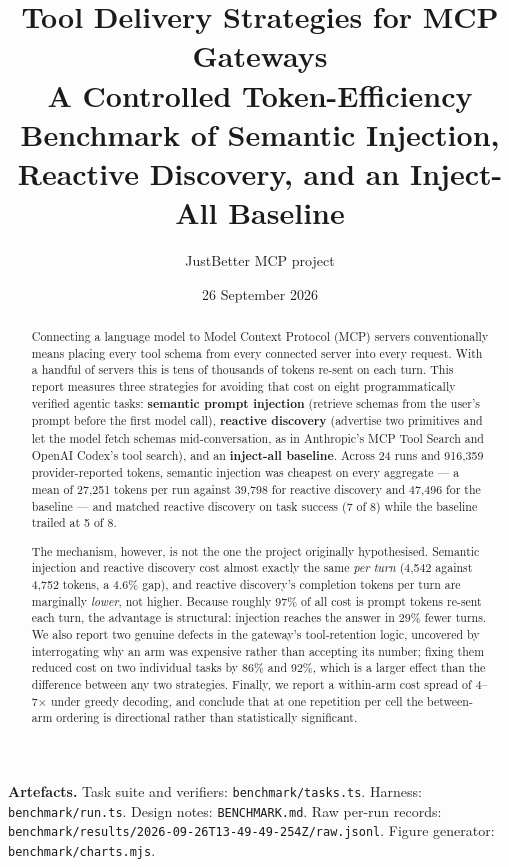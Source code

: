 \documentclass[11pt,a4paper]{article}
\title{\textbf{Tool Delivery Strategies for MCP Gateways}\\[0.35em]
\large A Controlled Token-Efficiency Benchmark of Semantic Injection,\\
Reactive Discovery, and an Inject-All Baseline}
\author{JustBetter MCP project}
\date{26 September 2026}
\begin{document}
\maketitle

\begin{abstract}
\noindent
Connecting a language model to Model Context Protocol (MCP) servers conventionally means placing
every tool schema from every connected server into every request. With a handful of servers this is
tens of thousands of tokens re-sent on each turn. This report measures three strategies for avoiding
that cost on eight programmatically verified agentic tasks: \textbf{semantic prompt injection}
(retrieve schemas from the user's prompt before the first model call), \textbf{reactive discovery}
(advertise two primitives and let the model fetch schemas mid-conversation, as in Anthropic's MCP
Tool Search and OpenAI Codex's tool search), and an \textbf{inject-all baseline}. Across 24 runs and
916{,}359 provider-reported tokens, semantic injection was cheapest on every aggregate --- a mean of
27{,}251 tokens per run against 39{,}798 for reactive discovery and 47{,}496 for the baseline --- and
matched reactive discovery on task success (7 of 8) while the baseline trailed at 5 of 8.

The mechanism, however, is not the one the project originally hypothesised. Semantic injection and
reactive discovery cost almost exactly the same \emph{per turn} (4{,}542 against 4{,}752 tokens, a
4.6\% gap), and reactive discovery's completion tokens per turn are marginally \emph{lower}, not
higher. Because roughly 97\% of all cost is prompt tokens re-sent each turn, the advantage is
structural: injection reaches the answer in 29\% fewer turns. We also report two genuine defects in
the gateway's tool-retention logic, uncovered by interrogating why an arm was expensive rather than
accepting its number; fixing them reduced cost on two individual tasks by 86\% and 92\%, which is a
larger effect than the difference between any two strategies. Finally, we report a within-arm cost
spread of 4--7$\times$ under greedy decoding, and conclude that at one repetition per cell the
between-arm ordering is directional rather than statistically significant.
\end{abstract}

\vspace{0.4em}
\noindent\textbf{Artefacts.} Task suite and verifiers: \texttt{benchmark/tasks.ts}. Harness:
\texttt{benchmark/run.ts}. Design notes: \texttt{BENCHMARK.md}. Raw per-run records:
\texttt{benchmark/results/2026-09-26T13-49-49-254Z/raw.jsonl}. Figure generator:
\texttt{benchmark/charts.mjs}.
\end{document}
